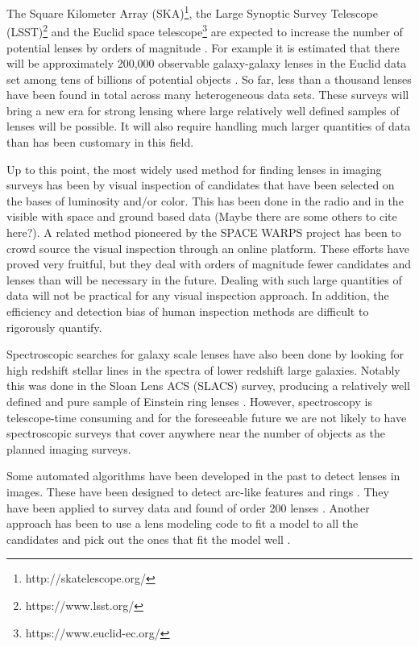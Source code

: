 \documentclass[useAMS,usenatbib]{mnras}
\newcommand{\red}[1]{{\color{red} #1}}
\begin{document}
The Square Kilometer Array (SKA)\footnote{http://skatelescope.org/}, the Large Synoptic Survey Telescope (LSST)\footnote{https://www.lsst.org/} and the Euclid space telescope\footnote{https://www.euclid-ec.org/} are expected to increase the number of potential lenses by orders of magnitude \citep{collett_15,euclidSLWGwhitepaper,2015aska.confE..84M,2010MNRAS.405.2579O}.   For example it is estimated that there will be approximately 200,000 observable galaxy-galaxy lenses in the Euclid data set among tens of billions of potential objects .  So far, less than a thousand lenses have been found in total across many heterogeneous data sets.  These surveys will bring a new era for strong lensing where large relatively well defined samples of lenses will be possible.  It will also require handling much larger quantities of data than has been customary in this field.

Up to this point, the most widely used method for finding lenses in imaging surveys has been by visual inspection of candidates that have been selected on the bases of luminosity and/or color.  This has been done in the radio \citep{2003MNRAS.341...13B} and in the visible with space and ground based data \citep{2008MNRAS.389.1311J,2008ApJS..176...19F,2014MNRAS.439.3392P} \red{(Maybe there are some others to cite here?)}.  A related method pioneered by the SPACE WARPS project \citep{2016MNRAS.455.1171M,2016MNRAS.455.1191M,2015MNRAS.452..502G} has been to crowd source the visual inspection through an online platform.  These efforts have proved very fruitful, but they deal with orders of magnitude fewer candidates and lenses than will be necessary in the future.  Dealing with such large quantities of data will not be practical for any visual inspection approach.  In addition, the efficiency and detection bias of human inspection methods are difficult to rigorously quantify.

Spectroscopic searches for galaxy scale lenses have also been done by looking for high redshift stellar lines in the spectra of lower redshift large galaxies.  Notably this was done in the Sloan Lens ACS (SLACS) survey, producing a relatively well defined and pure sample of Einstein ring lenses \citep{2006ApJ...638..703B}.  However, spectroscopy is telescope-time consuming and for the foreseeable future we are not likely to have spectroscopic surveys that cover anywhere near the number of objects as the planned imaging surveys.

Some automated algorithms have been developed in the past to detect lenses in images.  These have been designed to detect arc-like features \citep{2006astro.ph..6757A,2007A&A...472..341S, 2017A&A...597A.135B} and rings \citep{2014ApJ...785..144G,2014A&A...566A..63J}.  They have been applied to survey data and found of order 200 lenses \citep{2007A&A...461..813C,2012ApJ...749...38M,2016A&A...592A..75P}.  Another approach has been to use a lens modeling code to fit a model to all the candidates and pick out the ones that fit the model well \citep{2009ApJ...694..924M,2010A&A...517A..25S,2017arXiv170401585S}.
\end{document}

